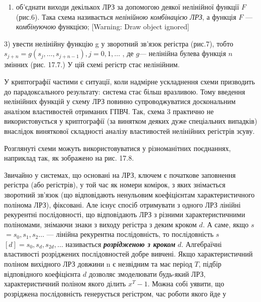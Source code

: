 {{\bigskip

{\par}


\bigskip


\bigskip

\liststyleWWviiiNumxlvii
\setcounter{saveenum}{\value{enumi}}
\begin{enumerate}
\setcounter{enumi}{\value{saveenum}}
\item об’єднати виходи декількох ЛРЗ за допомогою деякої нелінійної функції
$F$ (рис.6). Така схема називається \textit{нелінійною комбінацією ЛРЗ},
а функція  $F$ --- \textit{комбінуючою }функцією; [Warning: Draw object
ignored]
\end{enumerate}
3)  увести нелінійну функцію g у зворотний зв’язок регістра (рис.7), тобто 
$s_{j+n}=g(s_j,\dots,s_{j+n-1}),j=0,1,\dots$
, де  $g$--- нелінійна булева функція  $n$ змінних (рис. 17.7.)  У цій схемі 
регістр стає нелінійним. 


\bigskip


\bigskip

{\par}


\bigskip

 У криптографії частими є ситуації, коли надмірне ускладнення схеми призводить
до парадоксального результату: система стає більш вразливою. Тому введення
нелінійних функцій у схему ЛРЗ повинно супроводжуватися доскональним аналізом
властивостей отриманих ГПВЧ.  Так, схема 3 практично не використовується у
криптографії (за винятком деяких дуже спеціальних випадків)  внаслідок
виняткової складності  аналізу властивостей нелінійних регістрів зсуву.

Розглянуті схеми можуть використовуватися у різноманітних поєднаннях, наприклад
так, як зображено на рис. 17.8. 

Звичайно у системах, що основані на ЛРЗ, ключем є початкове заповнення регістра
(або регістрів), у той час як номери комірок, з яких знімається зворотний
зв’язок (що відповідають ненульовим коефіцієнтам характеристичного полінома
ЛРЗ), фіксовані. Але існує спосіб отримувати з одного ЛРЗ лінійні рекурентні
послідовності, що відповідають ЛРЗ з різними характеристичними поліномами,
знімаючи знаки з виходу регістра з деким кроком  $d$. А саме, якщо
\textbf{$s$} $=s_0,s_1,s_2\dots$ ---
лінійна рекурентна послідовність, то послідовність \textbf{$s$}
$[d]=s_0,s_d,s_{2d},\dots$ називається
\textbf{\textit{розрідженою з кроком}}\textbf{ } $d$. Алгебраїчні властивості
розріджених послідовностей добре вивчені. Якщо характеристичний поліном
вихідного ЛРЗ довжини n є незвідним та має період  $T$, підбір відповідного
коефіцієнта  $d$ дозволяє змоделювати будь-який ЛРЗ, характеристичний поліном
якого ділить  $x^{T}-1$. Можна собі уявити, що розріджена послідовність
генерується регістром, час роботи якого йде у

}}
